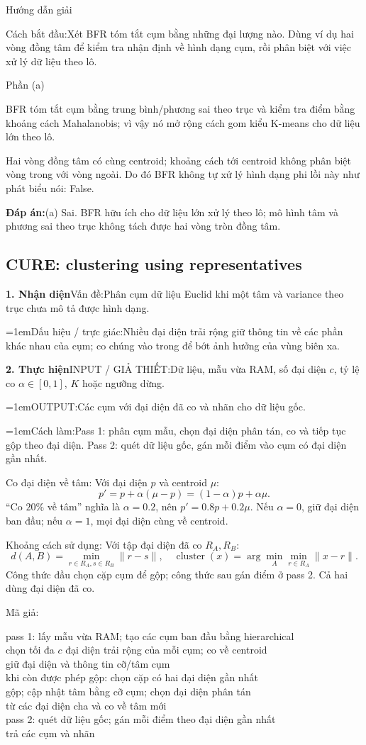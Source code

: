 \documentclass[10pt,a4paper,twocolumn]{article}
\makeatletter
\newcommand{\maptag}[1]{\phantomsection\@bsphack\protected@write\@auxout{}{\string\newlabel{#1}{{}{\thepage}{}{\@currentHref}{}}}\@esphack}
\newif\ifexamheadingprinted
\newcommand{\topic}[2]{%
  \global\examheadingprintedfalse\par\subsection{#2}\label{topic:#1}}
\newcommand{\key}[1]{#1:\enspace}
\newcommand{\solutionprompt}[1]{\par\addvspace{1pt}\noindent\key{Cách bắt đầu}#1\par\addvspace{2pt}}
\newcommand{\blocklabel}[1]{\par\noindent#1\par\nobreak}
\newcommand{\answer}[1]{%
  \par\addvspace{3pt}%
  \blocklabel{#1Hướng dẫn giải}}
\newcommand{\finalanswer}[1]{%
  \par\addvspace{3pt}\noindent\textbf{Đáp án:}\nobreak\enspace#1\par}
\newcommand{\guidepart}[1]{%
  \par\addvspace{1.5pt}%
  \blocklabel{Phần #1}}
\newcommand{\algfield}[2]{\par\noindent\hangindent=1em\relax#1:\enspace#2}
\newcommand{\unitfield}[4]{%
  \par\noindent\textbf{#1. #2}\enspace #3:\enspace #4}
\newcommand{\algsummary}[6]{%
  \begingroup\setlength{\parskip}{1pt}%
  \unitfield{1}{Nhận diện}{Vấn đề}{#1}%
  \algfield{Dấu hiệu / trực giác}{#2}%
  \if\relax\detokenize{#3}\relax\else\par\noindent#3\par\fi%
  \unitfield{2}{Thực hiện}{INPUT / GIẢ THIẾT}{#4}%
  \algfield{OUTPUT}{#5}%
  \algfield{Cách làm}{#6}\par\endgroup}
\newenvironment{algpseudo}{%
  \par\addvspace{2pt}\noindent
  \setlength{\parskip}{0pt}%
  Mã giả:\par\nobreak
  \begin{list}{}{\setlength{\leftmargin}{1em}\setlength{\topsep}{0pt}%
    \setlength{\partopsep}{0pt}\setlength{\parsep}{0pt}%
    \@beginparpenalty=10000\relax}%
  \item\relax
}{\end{list}\par\addvspace{3pt}}
\makeatother
\begin{document}
\answer{\maptag{answer:P25-Q7}\maptag{answer:P25-Q7a}}
\solutionprompt{Xét BFR tóm tắt cụm bằng những đại lượng nào. Dùng ví dụ hai vòng đồng tâm để kiểm tra nhận định về hình dạng cụm, rồi phân biệt với việc xử lý dữ liệu theo lô.}
\guidepart{(a)}
\begin{guidesteps}
\item BFR tóm tắt cụm bằng trung bình/phương sai theo trục và kiểm tra điểm bằng khoảng cách Mahalanobis; vì vậy nó mở rộng cách gom kiểu K-means cho dữ liệu lớn theo lô.
\item Hai vòng đồng tâm có cùng centroid; khoảng cách tới centroid không phân biệt vòng trong với vòng ngoài. Do đó BFR không tự xử lý hình dạng phi lồi này như phát biểu nói: False.
\end{guidesteps}
\finalanswer{(a) Sai. BFR hữu ích cho dữ liệu lớn xử lý theo lô; mô hình tâm và phương sai theo trục không tách được hai vòng tròn đồng tâm.}
\topic{cure}{CURE: clustering using representatives}

\algsummary{Phân cụm dữ liệu Euclid khi một tâm và variance theo trục chưa mô tả được hình dạng.}{Nhiều đại diện trải rộng giữ thông tin về các phần khác nhau của cụm; co chúng vào trong để bớt ảnh hưởng của vùng biên xa.}{}{Dữ liệu, mẫu vừa RAM, số đại diện $c$, tỷ lệ co $\alpha\in[0,1]$, $K$ hoặc ngưỡng dừng.}{Các cụm với đại diện đã co và nhãn cho dữ liệu gốc.}{Pass 1: phân cụm mẫu, chọn đại diện phân tán, co và tiếp tục gộp theo đại diện. Pass 2: quét dữ liệu gốc, gán mỗi điểm vào cụm có đại diện gần nhất.}

\key{Co đại diện về tâm} Với đại diện $p$ và centroid $\mu$:
\[
p'=p+\alpha(\mu-p)=(1-\alpha)p+\alpha\mu.
\]
``Co $20\%$ về tâm'' nghĩa là $\alpha=0.2$, nên $p'=0.8p+0.2\mu$. Nếu $\alpha=0$, giữ đại diện ban đầu; nếu $\alpha=1$, mọi đại diện cùng về centroid.

\key{Khoảng cách sử dụng} Với tập đại diện đã co $R_A,R_B$:
\[
d(A,B)=\min_{r\in R_A,s\in R_B}\|r-s\|,
\quad
\operatorname{cluster}(x)=\arg\min_A\min_{r\in R_A}\|x-r\|.
\]
Công thức đầu chọn cặp cụm để gộp; công thức sau gán điểm ở pass 2. Cả hai dùng đại diện đã co.

\begin{algpseudo}
pass 1: lấy mẫu vừa RAM; tạo các cụm ban đầu bằng hierarchical\\
\quad chọn tối đa $c$ đại diện trải rộng của mỗi cụm; co về centroid\\
\quad giữ đại diện và thông tin cỡ/tâm cụm\\
\quad khi còn được phép gộp: chọn cặp có hai đại diện gần nhất\\
\qquad gộp; cập nhật tâm bằng cỡ cụm; chọn đại diện phân tán\\
\qquad từ các đại diện cha và co về tâm mới\\
pass 2: quét dữ liệu gốc; gán mỗi điểm theo đại diện gần nhất\\
trả các cụm và nhãn
\end{algpseudo}
\end{document}
